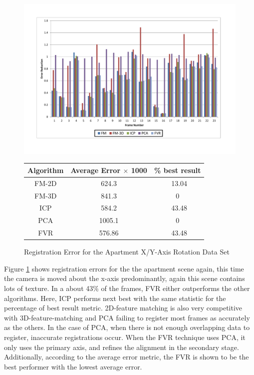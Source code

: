 \begin{figure}
\centering
\includegraphics[width=6in]{images/results/Apartment_Texture_Rotate_XAxis}
\caption{Registration Error for the Apartment X/Y-Axis Rotation Data Set}
\label{fig:PET1}

\begin{tabular}{ccc}
\hline
\textbf{Algorithm} & \textbf{Average Error $\times$ 1000} & \textbf{\% best result}\\ \hline
FM-2D	& 624.3 & ~13.04\\
FM-3D	& 841.3 & 0\\
ICP		& 584.2 & ~43.48\\
PCA		& 1005.1 & 0\\
FVR		& 576.86 & ~43.48\\
\end{tabular}
\end{figure} 



Figure \ref{fig:PET1} shows registration errors for the the apartment scene again, this time the camera is moved about the x-axis predominantly, again this scene contains lots of texture. In a about 43\% of the frames, FVR either outperforms the other algorithms. Here, ICP performs next best with the same statistic for the percentage of best result metric. 2D-feature matching is also very competitive with 3D-feature-matching and PCA failing to register most frames as accurately as the others. In the case of PCA, when there is not enough overlapping data to register, inaccurate registrations occur. When the FVR technique uses PCA, it only uses the primary axis, and refines the alignment in the secondary stage. Additionally, according to the average error metric, the FVR is shown to be the best performer with the lowest average error. \\


